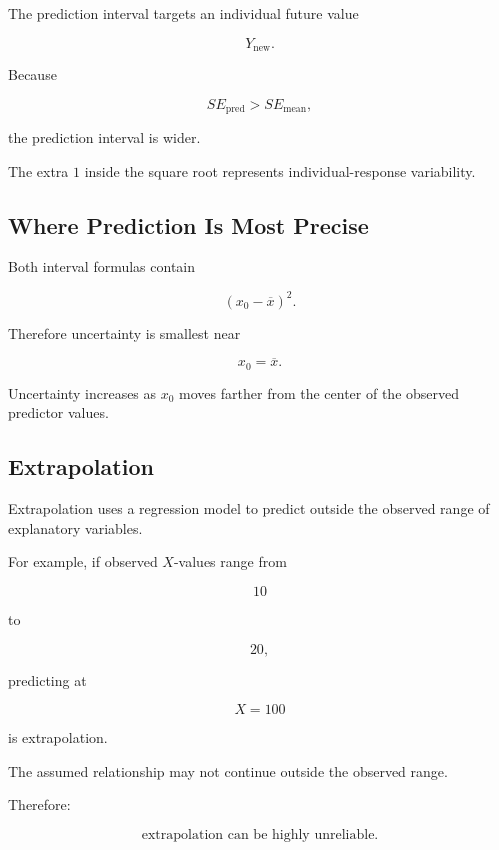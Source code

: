 The prediction interval targets an individual future value

\[
Y_{\text{new}}.
\]

Because

\[
SE_{\text{pred}}
>
SE_{\text{mean}},
\]

the prediction interval is wider.

The extra \(1\) inside the square root represents individual-response
variability.

\subsection{Where Prediction Is Most Precise}
\label{subsec:prediction-precision-location}

Both interval formulas contain

\[
(x_0-\overline{x})^2.
\]

Therefore uncertainty is smallest near

\[
\boxed{
x_0=\overline{x}.
}
\]

Uncertainty increases as \(x_0\) moves farther from the center of the
observed predictor values.

\subsection{Extrapolation}
\label{subsec:regression-extrapolation}

Extrapolation uses a regression model to predict outside the observed
range of explanatory variables.

For example, if observed \(X\)-values range from

\[
10
\]

to

\[
20,
\]

predicting at

\[
X=100
\]

is extrapolation.

The assumed relationship may not continue outside the observed range.

Therefore:

\[
\boxed{
\text{extrapolation can be highly unreliable}.
}
\]

